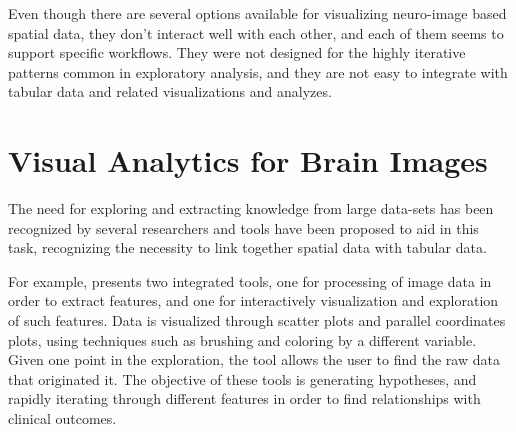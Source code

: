 Even though there are several options available for visualizing neuro-image based spatial data, they don't interact well with each other, and each of them seems to support  specific workflows. They were not designed for the highly iterative patterns common in exploratory analysis, and they are not easy to integrate with tabular data and related visualizations and analyzes. 







\section{Visual Analytics for Brain Images}


The need for exploring and extracting knowledge from large data-sets has been recognized by several researchers and tools have been proposed to aid in this task, recognizing the necessity to link together spatial data with tabular data. 

For example, \autocite{steenwijk_integrated_2010} presents two integrated tools, one for processing of image data in order to extract features, and one for interactively visualization and exploration of such features. Data is visualized through scatter plots and parallel coordinates plots, using techniques such as brushing and coloring by a different variable.  Given one point in the exploration, the tool allows the user to find the raw data that originated it. The objective of these tools is generating hypotheses, and rapidly iterating through different features in order to find relationships with clinical outcomes. 

